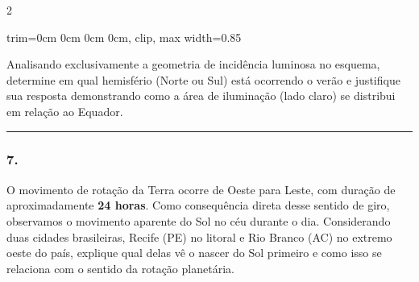 \documentclass[twoside, 10pt, a4paper]{article}
\newlength{\espacoPreQuestao}
\newlength{\espacoQuestao}
\newcommand{\larguraTikz}{0.85\linewidth} %
\begin{document}
\begin{multicols*}{2}
\begin{center}
\begin{adjustbox}{trim=0cm 0cm 0cm 0cm, clip, max width=\larguraTikz}
\end{adjustbox}
\end{center}

Analisando exclusivamente a geometria de incidência luminosa no esquema, determine em qual hemisfério (Norte ou Sul) está ocorrendo o verão e justifique sua resposta demonstrando como a área de iluminação (lado claro) se distribui em relação ao Equador.
\par\vspace{\espacoQuestao}

\noindent\textcolor{CorLinha}{\rule{\linewidth}{0.5pt}} 
\par\vspace{\espacoPreQuestao}
\subsubsection*{7.} O movimento de rotação da Terra ocorre de Oeste para Leste, com duração de aproximadamente \textbf{24 horas}. Como consequência direta desse sentido de giro, observamos o movimento aparente do Sol no céu durante o dia. Considerando duas cidades brasileiras, Recife (PE) no litoral e Rio Branco (AC) no extremo oeste do país, explique qual delas vê o nascer do Sol primeiro e como isso se relaciona com o sentido da rotação planetária.
\par\vspace{\espacoQuestao}


\end{multicols*}
\end{document}
